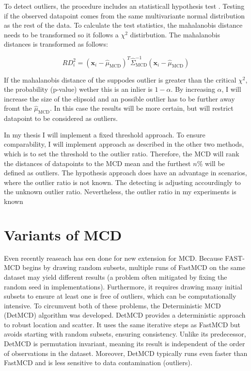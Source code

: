 To detect outliers, the procedure includes an statisticall hypothesis test .
Testing if the observed datapoint comes from the same multivariante normal distribution as the rest of the data.
To calculate the test statistics, the mahalanobis distance needs to be transformed so it follows a $\chi^2$ distirbution.
The mahalanobis distances is transformed as follows:

\begin{equation}
    RD_i^2 = (\mathbf{x}_i - \hat{\mu}_{\text{MCD}})^T \hat{\Sigma}_{\text{MCD}}^{-1} (\mathbf{x}_i - \hat{\mu}_{\text{MCD}})
    \label{eq:robust_mahalanobis}
\end{equation}

If the mahalanobis distance of the suppodes outlier is greater than the critical $\chi^2$, the probability (p-value) wether this is an inlier is $1- \alpha$.
By increasing $\alpha$, I will increase the size of the elipsoid and an possible outlier has to be further away fromt the $\hat{\mu}_{\text{MCD}}$.
In this case the results will be more certain, but will restrict datapoint to be considered as outliers.


In my thesis I will implement a fixed threshold approach.
To ensure comparability, I will implement approach as described in the other two methods, which is to set the threshold to the outlier ratio.
Therefore, the MCD will rank the distances of datapoints to the MCD mean and the furthest $n\%$ will be defined as outliers.
The hypothesis approach does have an advantage in scenarios, where the outlier ratio is not known.
The detecting is adjusting accourdingly to the unknown outlier ratio.
Nevertheless, the outlier ratio in my experiments is known 


\section*{Variants of MCD}
Even recently reaseach has een done for new extension for MCD.
Because FAST-MCD begins by drawing random subsets, multiple runs of FastMCD on the same dataset may yield different results (a problem often mitigated by fixing the random seed in implementations). 
Furthermore, it requires drawing many initial subsets to ensure at least one is free of outliers, which can be computationally intensive. 
To circumvent both of these problems, the Deterministic MCD (DetMCD) algorithm was developed. \citep[p.621 pp.]{hubert2012deterministic}
DetMCD provides a deterministic approach to robust location and scatter. 
It uses the same iterative steps as FastMCD but avoids starting with random subsets, ensuring consistency. 
Unlike its predecessor, DetMCD is permutation invariant, meaning its result is independent of the order of observations in the dataset. 
Moreover, DetMCD typically runs even faster than FastMCD and is less sensitive to data contamination (outliers).


